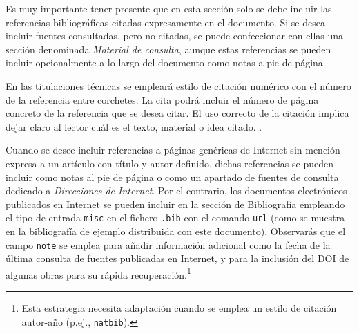 Es muy importante tener presente que en esta sección solo se debe incluir las referencias bibliográficas citadas expresamente en el documento. Si se desea incluir fuentes consultadas, pero no citadas, se puede confeccionar con ellas una sección denominada \emph{Material de consulta}, aunque estas referencias se pueden incluir opcionalmente a lo largo del documento como notas a pie de página.

En las titulaciones técnicas se empleará estilo de citación numérico con el número de la referencia entre corchetes. La cita podrá incluir el número de página concreto de la referencia que se desea citar. El uso correcto de la citación implica dejar claro al lector cuál es el texto, material o idea citado. .

Cuando se desee incluir referencias a páginas genéricas de Internet sin mención expresa a un artículo con título y autor definido, dichas referencias se pueden incluir como notas al pie de página o como un apartado de fuentes de consulta dedicado a \emph{Direcciones de Internet}. Por el contrario, los documentos electrónicos publicados en Internet se pueden incluir en la sección de Bibliografía empleando el tipo de entrada \texttt{misc} en el fichero \texttt{.bib} con el comando \texttt{url} (como se muestra en la bibliografía de ejemplo distribuida con este documento). Observarás que el campo \texttt{note} se emplea para añadir información adicional como la fecha de la última consulta de fuentes publicadas en Internet, y para la inclusión del DOI de algunas obras para su rápida recuperación.\footnote{Esta estrategia necesita adaptación cuando se emplea un estilo de citación autor-año (p.ej., \texttt{natbib}).}







